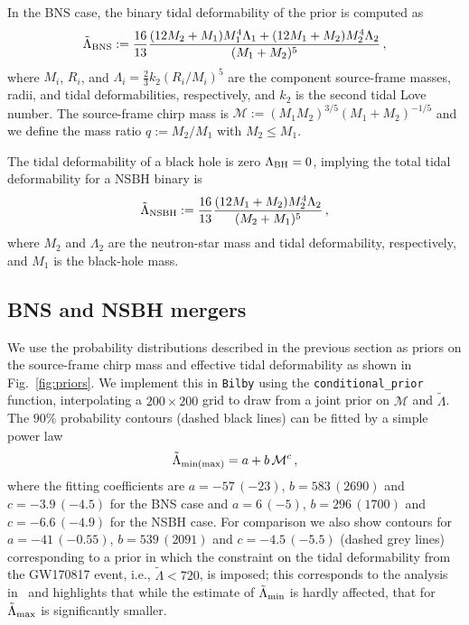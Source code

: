 \documentclass[twocolumn]{aastex631}
\begin{document}
In the BNS case, the binary tidal deformability of the prior is computed
as
%
\begin{equation} 
 \tilde{\Lambda}_{\rm BNS} := \frac{16}{13} \frac{ (12M_2 + M_1) M_1^4
   \Lambda_1 + (12M_1 + M_2) M_2^4 \Lambda_2}{(M_1 + M_2)^5}\,,
\end{equation}
%
where $M_i$, $R_i$, and $\Lambda_i = \frac{2}{3} k_2 \left( R_i/M_i
\right)^5$ are the component source-frame masses, radii, and tidal
deformabilities, respectively, and $k_2$ is the second tidal Love
number. The source-frame chirp mass is $\mathcal{M} := (M_1
M_2)^{3/5} (M_1+M_2)^{-1/5}$ and we define the mass ratio $q := M_2/M_1$
with $M_2\le M_1$.
	
The tidal deformability of a black hole is zero $\Lambda_{\rm BH}=0$,
implying the total tidal deformability for a NSBH binary is
%
\begin{equation} 
 \tilde{\Lambda}_{{\rm NSBH}} := \frac{16}{13} \frac{ (12M_{1} + M_{2})
   M_{2}^4 \Lambda_{2}}{(M_{2} + M_{1})^5}\,,
 \end{equation}
%
where $M_{2}$ and $\Lambda_{2}$ are the neutron-star mass and
tidal deformability, respectively, and $M_{1}$ is the black-hole
mass. 

\subsection{BNS and NSBH mergers}

We use the probability distributions described in the previous section as
priors on the source-frame chirp mass and effective tidal deformability
as shown in Fig.~\ref{fig:priors}. We implement this in \texttt{Bilby}
using the \texttt{conditional\_prior} function, interpolating a
$200\times200$ grid to draw from a joint prior on $\mathcal{M}$ and
$\tilde{\Lambda}$. The $90\%$ probability contours (dashed black lines) can 
be fitted by a simple power law 
%
\begin{equation}\label{eq:fit}
  \tilde\Lambda_{{\rm min}(\rm max)}=a + b \,\mathcal{M}^c\,,
\end{equation}
%
where the fitting coefficients are $a=-57\,(-23)$, $b=583\,(2690)$ and
$c=-3.9\,(-4.5)$ for the BNS case and $a=6\,(-5)$, $b=296\,(1700)$ and
$c=-6.6\,(-4.9)$ for the NSBH case. For comparison we also show contours
for $a=-41\,(-0.55)$, $b=539\,(2091)$ and $c=-4.5\,(-5.5)$ (dashed grey
lines) corresponding to a prior in which the constraint on the tidal
deformability from the GW170817 event, i.e., $\tilde{\Lambda} < 720$, is
imposed; this corresponds to the analysis in~\citet{Altiparmak:2022} and
highlights that while the estimate of $\tilde\Lambda_{\rm min}$ is hardly
affected, that for $\tilde\Lambda_{\rm max}$ is significantly smaller.
\end{document}
